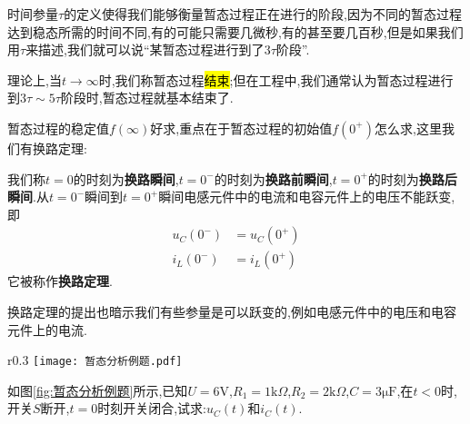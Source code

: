 \Par 时间参量$\tau $的定义使得我们能够衡量暂态过程正在进行的阶段,因为不同的暂态过程达到稳态所需的时间不同,有的可能只需要几微秒,有的甚至要几百秒,但是如果我们用$\tau $来描述,我们就可以说“某暂态过程进行到了$3\tau $阶段”.

\Par 理论上,当$t\to \infty$时,我们称暂态过程\hl{结束};但在工程中,我们通常认为暂态过程进行到$3\tau \sim 5\tau $阶段时,暂态过程就基本结束了.

\Par 暂态过程的稳定值$f\left( \infty \right) $好求,重点在于暂态过程的初始值$f\left( 0^+ \right) $怎么求,这里我们有换路定理:
\begin{theorem}[换路定理]
    \Par 我们称$t=0$的时刻为\textbf{换路瞬间},$t=0^-$的时刻为\textbf{换路前瞬间},$t=0^+$的时刻为\textbf{换路后瞬间}.从$t=0^-$瞬间到$t=0^+$瞬间电感元件中的电流和电容元件上的电压不能跃变,即
    \begin{equation}
        \begin{aligned}
            u_C\left( 0^- \right) &=u_C\left( 0^+ \right)\\
            i_L\left( 0^- \right) &=i_L\left( 0^+ \right)
        \end{aligned}
    \end{equation}
    它被称作\textbf{换路定理}.
\end{theorem}
换路定理的提出也暗示我们有些参量是可以跃变的,例如电感元件中的电压和电容元件上的电流.

\begin{wrapfigure}[3]{r}{0.3\textwidth}
    \centering
    \texttt{[image: 暂态分析例题.pdf]}
    \caption{例\ref{exm:暂态分析}用图}
    \label{fig:暂态分析例题}
\end{wrapfigure}
\begin{example}\label{exm:暂态分析}
    如图\ref{fig:暂态分析例题}所示,已知$U=6\mathrm{V}$,$R_1=1\mathrm{k}\Omega $,$R_2=2\mathrm{k}\Omega $,$C=3\mathrm{\mu F}$,在$t<0$时,开关$S$断开,$t=0$时刻开关闭合,试求:$u_C\left( t \right) $和$i_C\left( t \right) $.
\end{example}

